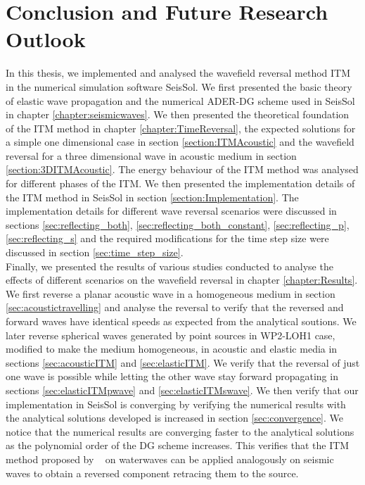 \chapter{Conclusion and Future Research Outlook}\label{chapter:Conclusion}
In this thesis, we implemented and analysed the wavefield reversal method \ac{ITM} in the numerical simulation software SeisSol. We first presented the basic theory of elastic wave propagation and the numerical \ac{ADER}-\ac{DG} scheme used in SeisSol in chapter \ref{chapter:seismicwaves}.
We then presented the theoretical foundation of the \ac{ITM} method in chapter \ref{chapter:TimeReversal}, the expected solutions for a simple one dimensional case in section \ref{section:ITMAcoustic} and the wavefield reversal for a three dimensional wave in acoustic medium in section \ref{section:3DITMAcoustic}.
The energy behaviour of the \ac{ITM} method was analysed for different phases of the \ac{ITM}.
We then presented the implementation details of the \ac{ITM} method in SeisSol in section \ref{section:Implementation}. The implementation details 
for different wave reversal scenarios were discussed in sections \ref{sec:reflecting_both}, \ref{sec:reflecting_both_constant}, \ref{sec:reflecting_p}, \ref{sec:reflecting_s} and the required modifications for the time step size were discussed in section \ref{sec:time_step_size}. \\

Finally, we presented the results of various studies conducted to analyse the effects of different scenarios on the wavefield reversal in chapter \ref{chapter:Results}.
We first reverse a planar acoustic wave in a homogeneous medium in section \ref{sec:acoustictravelling} and analyse the reversal to verify that the reversed and forward waves have identical speeds as expected from the analytical soutions.
We later reverse spherical waves generated by point sources in WP2-LOH1 case, modified to make the medium homogeneous, in acoustic and elastic media in sections \ref{sec:acousticITM} and \ref{sec:elasticITM}. We verify that the reversal of just one wave is possible while letting 
the other wave stay forward propagating in sections \ref{sec:elasticITMpwave} and \ref{sec:elasticITMswave}. We then verify that our implementation in SeisSol is converging by verifying the numerical results with the analytical solutions developed is increased in section \ref{sec:convergence}. We notice that
the numerical results are converging faster to the analytical solutions as the polynomial order of the \ac{DG} scheme increases. This verifies that the \ac{ITM}
method proposed by ~\parencite{Bacot2016} on waterwaves can be applied analogously on seismic waves to obtain a reversed component retracing them to the source. \\

